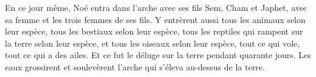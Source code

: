 En ce jour même, Noé entra dans l’arche avec ses fils Sem, Cham et Japhet,
	avec sa femme et les trois femmes de ses fils.
Y entrèrent aussi tous les animaux selon leur espèce,
	tous les bestiaux selon leur espèce,
	tous les reptiles qui rampent sur la terre selon leur espèce,
	et tous les oiseaux selon leur espèce, tout ce qui vole, tout ce qui a des ailes.
Et ce fut le déluge sur la terre pendant quarante jours.
Les eaux grossirent et soulevèrent l’arche qui s’éleva au-dessus de la terre.
